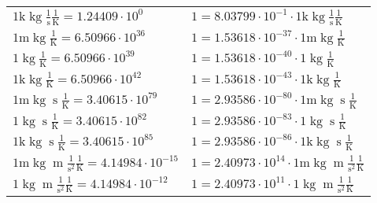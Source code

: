 \begin{center}
\begin{longtable}{l l}
{\color{gray}$1 \bm{\mathrm{ k}}\operatorname{kg}{}\frac1{\operatorname{s}}{}\frac1{\operatorname{K}} = 1.24409\cdot10^{0} $}   & {\color{gray}$ 1 = 8.03799\cdot10^{-1} \cdot 1 \bm{\mathrm{ k}}\operatorname{kg}{}\frac1{\operatorname{s}}{}\frac1{\operatorname{K}}$}  \\
{\color{gray}$1 \bm{\mathrm{ m}}\operatorname{kg}{}{}{}\frac1{\operatorname{K}} = 6.50966\cdot10^{36} $}   & {\color{gray}$ 1 = 1.53618\cdot10^{-37} \cdot 1 \bm{\mathrm{ m}}\operatorname{kg}{}{}{}\frac1{\operatorname{K}}$}  \\
{\color{black}$1 \bm{\mathrm{ }}\operatorname{kg}{}{}{}\frac1{\operatorname{K}} = 6.50966\cdot10^{39} $}   & {\color{black}$ 1 = 1.53618\cdot10^{-40} \cdot 1 \bm{\mathrm{ }}\operatorname{kg}{}{}{}\frac1{\operatorname{K}}$}  \\
{\color{gray}$1 \bm{\mathrm{ k}}\operatorname{kg}{}{}{}\frac1{\operatorname{K}} = 6.50966\cdot10^{42} $}   & {\color{gray}$ 1 = 1.53618\cdot10^{-43} \cdot 1 \bm{\mathrm{ k}}\operatorname{kg}{}{}{}\frac1{\operatorname{K}}$}  \\
{\color{gray}$1 \bm{\mathrm{ m}}\operatorname{kg}{}{\operatorname{s}}{}\frac1{\operatorname{K}} = 3.40615\cdot10^{79} $}   & {\color{gray}$ 1 = 2.93586\cdot10^{-80} \cdot 1 \bm{\mathrm{ m}}\operatorname{kg}{}{\operatorname{s}}{}\frac1{\operatorname{K}}$}  \\
{\color{black}$1 \bm{\mathrm{ }}\operatorname{kg}{}{\operatorname{s}}{}\frac1{\operatorname{K}} = 3.40615\cdot10^{82} $}   & {\color{black}$ 1 = 2.93586\cdot10^{-83} \cdot 1 \bm{\mathrm{ }}\operatorname{kg}{}{\operatorname{s}}{}\frac1{\operatorname{K}}$}  \\
{\color{gray}$1 \bm{\mathrm{ k}}\operatorname{kg}{}{\operatorname{s}}{}\frac1{\operatorname{K}} = 3.40615\cdot10^{85} $}   & {\color{gray}$ 1 = 2.93586\cdot10^{-86} \cdot 1 \bm{\mathrm{ k}}\operatorname{kg}{}{\operatorname{s}}{}\frac1{\operatorname{K}}$}  \\
{\color{gray}$1 \bm{\mathrm{ m}}\operatorname{kg}{\operatorname{m}}\frac1{\operatorname{s}^2}{}\frac1{\operatorname{K}} = 4.14984\cdot10^{-15} $}   & {\color{gray}$ 1 = 2.40973\cdot10^{14} \cdot 1 \bm{\mathrm{ m}}\operatorname{kg}{\operatorname{m}}\frac1{\operatorname{s}^2}{}\frac1{\operatorname{K}}$}  \\
{\color{black}$1 \bm{\mathrm{ }}\operatorname{kg}{\operatorname{m}}\frac1{\operatorname{s}^2}{}\frac1{\operatorname{K}} = 4.14984\cdot10^{-12} $}   & {\color{black}$ 1 = 2.40973\cdot10^{11} \cdot 1 \bm{\mathrm{ }}\operatorname{kg}{\operatorname{m}}\frac1{\operatorname{s}^2}{}\frac1{\operatorname{K}}$}  \\

\end{longtable}
\end{center}
